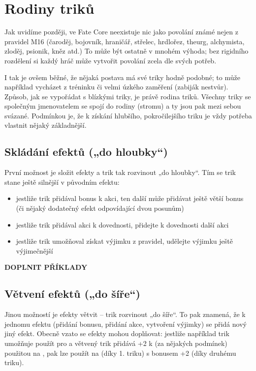 \documentclass[../main.tex]{subfiles}
\begin{document}
\section{Rodiny triků}
\label{sec:trik-rodiny}

Jak uvidíme později, ve Fate Core neexistuje nic jako povolání známé nejen z pravidel M16 (čaroděj, bojovník, hraničář, střelec, hrdlořez, theurg, alchymista, zloděj, psionik, kněz atd.) To může být ostatně v mnohém výhoda; bez rigidního rozdělení si každý hráč může vytvořit povolání zcela dle svých potřeb.

I tak je ovšem běžné, že nějaká postava má své triky hodně podobné; to může například vycházet z tréninku či velmi úzkého zaměření (zabiják nestvůr). Způsob, jak se vypořádat s blízkými triky, je právě rodina triků. Všechny triky se společným jmenovatelem se spojí do rodiny (stromu) a ty jsou pak mezi sebou svázané. Podmínkou je, že k získání hlubšího, pokročilejšího triku je vždy potřeba vlastnit nějaký základnější.

\subsection{Skládání efektů („do hloubky“)}
\label{sec:trik-skladani}
První možnost je složit efekty a trik tak rozvinout „do hloubky“. Tím se trik stane ještě silnější v původním efektu:

\begin{itemize}
\item jestliže trik přidával bonus k akci, ten další může přidávat ještě větší bonus (či nějaký dodatečný efekt odpovídající dvou posunům)
\item jestliže trik přidával akci k dovednosti, přidejte k dovednosti další akci
\item jestliže trik umožňoval získat výjimku z pravidel, udělejte výjimku ještě výjimečnější
\end{itemize}

\textbf{DOPLNIT PŘÍKLADY}

\subsection{Větvení efektů („do šíře“)}
\label{sec:trik-vetveni}
Jinou možností je efekty větvit – trik rozvinout „do šíře“. To pak znamená, že k jednomu efektu (přidání bonusu, přidání akce, vytvoření výjimky) se přidá nový jiný efekt. Obecně vzato se efekty mohou doplňovat: jestliže například trik umožňuje použít  pro  a větvený trik přidává +2 k  (za nějakých podmínek) použitou na , pak lze použít  na  (díky 1. triku) s bonusem +2 (díky druhému triku).
\end{document}
